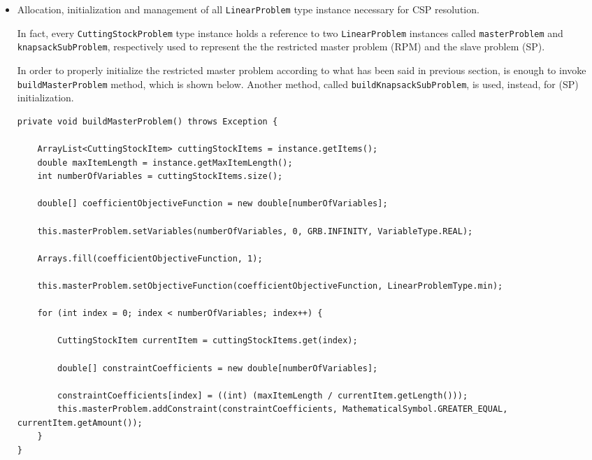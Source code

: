 \documentclass[10pt,a4paper]{article}
\begin{document}
\begin{itemize}

\item Allocation, initialization and management of all \texttt{LinearProblem} type instance necessary for CSP resolution.

In fact, every \texttt{CuttingStockProblem} type instance holds a reference to two \texttt{LinearProblem} instances called \texttt{masterProblem} and \texttt{knapsackSubProblem}, respectively used to represent the the restricted master problem (RPM) and the slave problem (SP).

In order to properly initialize the restricted master problem according to what has been said in previous section, is enough to invoke \texttt{buildMasterProblem} method, which is shown below. Another method, called \texttt{buildKnapsackSubProblem}, is used, instead, for (SP) initialization.

\begin{adjustwidth}{-2cm}{-2cm}
\begin{lstlisting}[frame=lines, caption={\texttt{buildMasterProblem()} method implementation.}, label={code:cga}]
private void buildMasterProblem() throws Exception {

    ArrayList<CuttingStockItem> cuttingStockItems = instance.getItems();
    double maxItemLength = instance.getMaxItemLength();
    int numberOfVariables = cuttingStockItems.size();

    double[] coefficientObjectiveFunction = new double[numberOfVariables];

    this.masterProblem.setVariables(numberOfVariables, 0, GRB.INFINITY, VariableType.REAL);

    Arrays.fill(coefficientObjectiveFunction, 1);

    this.masterProblem.setObjectiveFunction(coefficientObjectiveFunction, LinearProblemType.min);

    for (int index = 0; index < numberOfVariables; index++) {

        CuttingStockItem currentItem = cuttingStockItems.get(index);

        double[] constraintCoefficients = new double[numberOfVariables];

        constraintCoefficients[index] = ((int) (maxItemLength / currentItem.getLength()));
        this.masterProblem.addConstraint(constraintCoefficients, MathematicalSymbol.GREATER_EQUAL, currentItem.getAmount());
    }
}
\end{lstlisting}
\end{adjustwidth} 


\end{itemize}
\end{document}
